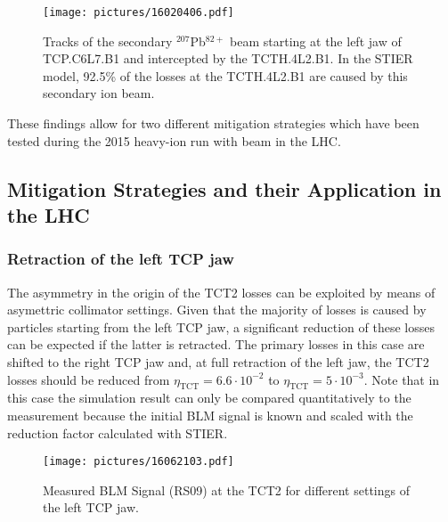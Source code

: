 \begin{figure}[b]  
    \centering
    \texttt{[image: pictures/16020406.pdf]}
    \caption{Tracks of the secondary $^{207}$Pb$^{82+}$ beam starting at the left jaw of TCP.C6L7.B1 and intercepted by the TCTH.4L2.B1. In the STIER model, 92.5\% of the losses at the TCTH.4L2.B1 are caused by this secondary ion beam.}  
    \label{pic:16020405}
\end{figure}



These findings allow for two different mitigation strategies which have been tested during the 2015 heavy-ion run with beam in the LHC.


\subsection{Mitigation Strategies and their Application in the LHC}

\subsubsection{Retraction of the left TCP jaw}

The asymmetry in the origin of the TCT2 losses can be exploited by means of asymettric collimator settings. Given that the majority of losses is caused by particles starting from the left TCP jaw, a significant reduction of these losses can be expected if the latter is retracted. The primary losses in this case are shifted to the right TCP jaw and, at full retraction of the left jaw, the TCT2 losses should be reduced from $\eta_{\text{TCT}} = 6.6\cdot 10^{-2}$ to $\eta_{\text{TCT}} = 5 \cdot 10^{-3}$. Note that in this case the simulation result can only be compared quantitatively to the measurement because the initial BLM signal is known and scaled with the reduction factor calculated with STIER.


\begin{figure}[htbp]  
    \centering
    \texttt{[image: pictures/16062103.pdf]}
    \caption{Measured BLM Signal (RS09) at the TCT2 for different settings of the left TCP jaw.}  
    \label{pic:16020307}
\end{figure}


